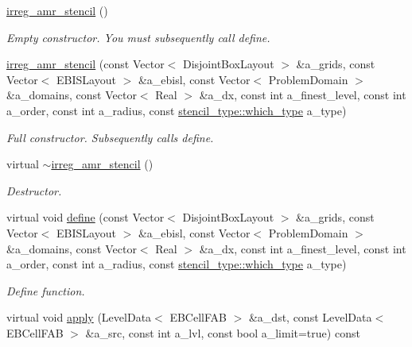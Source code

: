 \begin{DoxyCompactItemize}
\item 
\hyperlink{classirreg__amr__stencil_a43dec56eeb2c3cd6471a286331d394b3}{irreg\+\_\+amr\+\_\+stencil} ()
\begin{DoxyCompactList}\small\item\em Empty constructor. You must subsequently call define. \end{DoxyCompactList}\item 
\hyperlink{classirreg__amr__stencil_aa29d85a19c160d2dd58b42816cc23698}{irreg\+\_\+amr\+\_\+stencil} (const Vector$<$ Disjoint\+Box\+Layout $>$ \&a\+\_\+grids, const Vector$<$ E\+B\+I\+S\+Layout $>$ \&a\+\_\+ebisl, const Vector$<$ Problem\+Domain $>$ \&a\+\_\+domains, const Vector$<$ Real $>$ \&a\+\_\+dx, const int a\+\_\+finest\+\_\+level, const int a\+\_\+order, const int a\+\_\+radius, const \hyperlink{namespacestencil__type_a1ffed19935b7289b50e8dcc017ee99c8}{stencil\+\_\+type\+::which\+\_\+type} a\+\_\+type)
\begin{DoxyCompactList}\small\item\em Full constructor. Subsequently calls define. \end{DoxyCompactList}\item 
virtual \hyperlink{classirreg__amr__stencil_aa6e78522169277c8d867391159cb551a}{$\sim$irreg\+\_\+amr\+\_\+stencil} ()
\begin{DoxyCompactList}\small\item\em Destructor. \end{DoxyCompactList}\item 
virtual void \hyperlink{classirreg__amr__stencil_ad46c7411859c9167938341c2d7c72d40}{define} (const Vector$<$ Disjoint\+Box\+Layout $>$ \&a\+\_\+grids, const Vector$<$ E\+B\+I\+S\+Layout $>$ \&a\+\_\+ebisl, const Vector$<$ Problem\+Domain $>$ \&a\+\_\+domains, const Vector$<$ Real $>$ \&a\+\_\+dx, const int a\+\_\+finest\+\_\+level, const int a\+\_\+order, const int a\+\_\+radius, const \hyperlink{namespacestencil__type_a1ffed19935b7289b50e8dcc017ee99c8}{stencil\+\_\+type\+::which\+\_\+type} a\+\_\+type)
\begin{DoxyCompactList}\small\item\em Define function. \end{DoxyCompactList}\item 
virtual void \hyperlink{classirreg__amr__stencil_ac0fc9c2298bc99067b535eae84b5ccff}{apply} (Level\+Data$<$ E\+B\+Cell\+F\+AB $>$ \&a\+\_\+dst, const Level\+Data$<$ E\+B\+Cell\+F\+AB $>$ \&a\+\_\+src, const int a\+\_\+lvl, const bool a\+\_\+limit=true) const 

\end{DoxyCompactItemize}
